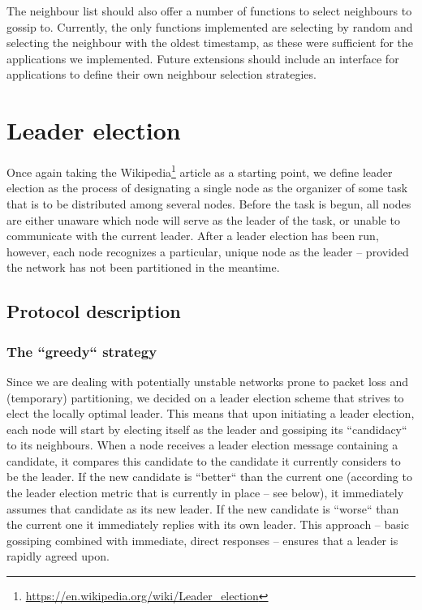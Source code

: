 \documentclass[11pt,
  a4paper,
  ngerman,
  BCOR=7mm
]{scrartcl}
\begin{document}
The neighbour list should also offer a number of functions to select
neighbours to gossip to. Currently, the only functions implemented are
selecting by random and selecting the neighbour with the oldest
timestamp, as these were sufficient for the applications we implemented.
Future extensions should include an interface for applications to define
their own neighbour selection strategies.

\section*{Leader election}
\label{sec:Leader_election}
Once again taking the
Wikipedia\footnote{\url{https://en.wikipedia.org/wiki/Leader_election}}
article as a starting point, we define leader election as the process of
designating a single node as the organizer of some task that is to be
distributed among several nodes.  Before the task is begun, all nodes
are either unaware which node will serve as the leader of the task, or
unable to communicate with the current leader. After a leader election
has been run, however, each node recognizes a particular, unique node as
the leader -- provided the network has not been partitioned in the
meantime.

\subsection*{Protocol description}
\label{sub:protocol_leader_election}

\subsubsection*{The ``greedy`` strategy}
\label{ssub:greedy_leader_election}
Since we are dealing with potentially unstable networks prone to packet
loss and (temporary) partitioning, we decided on a leader election
scheme that strives to elect the locally optimal leader. This means that
upon initiating a leader election, each node will start by electing
itself as the leader and gossiping its ``candidacy`` to its neighbours.
When a node receives a leader election message containing a candidate,
it compares this candidate to the candidate it currently considers to be
the leader. If the new candidate is ``better`` than the current one
(according to the leader election metric that is currently in place --
see below), it immediately assumes that candidate as its new leader. If
the new candidate is ``worse`` than the current one it immediately
replies with its own leader. This approach -- basic gossiping combined
with immediate, direct responses -- ensures that a leader is rapidly
agreed upon.
\end{document}

